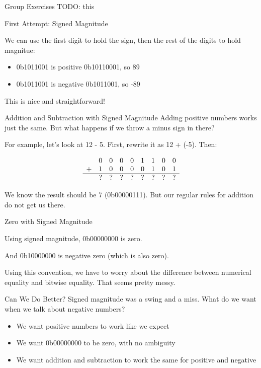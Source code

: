 \begin{frame}{Group Exercises}
TODO: this
\end{frame}



\begin{frame}{First Attempt: Signed Magnitude}

	We can use the first digit to hold the sign, then the rest of the digits to
	hold magnitue:

	\begin{itemize}
		\item 0b1011001 is positive 0b10110001, so 89
		\item 0b1011001 is negative 0b1011001, so -89
	\end{itemize}

	This is nice and straightforward!

\end{frame}

\begin{frame}{Addition and Subtraction with Signed Magnitude}
	Adding positive numbers works just the same. But what happens if we throw a minus sign in there?

	For example, let's look at 12 - 5. First, rewrite it as 12 + (-5). Then:

	\[
		\begin{array}{ccccccccc}
			  & 0 & 0 & 0 & 0 & 1 & 1 & 0 & 0 \\
			+ & 1 & 0 & 0 & 0 & 0 & 1 & 0 & 1 \\
			\hline
			  & ? & ? & ? & ? & ? & ? & ? & ? \\
		\end{array}
	\]

	We know the result should be 7 (0b00000111). But our regular rules for addition
	do not get us there.
\end{frame}

\begin{frame}{Zero with Signed Magnitude}

	Using signed magnitude, 0b00000000 is zero.

	And 0b10000000 is negative zero (which is also zero).

	Using this convention, we have to worry about the difference between numerical
	equality and bitwise equality. That seems pretty messy.
\end{frame}

\begin{frame}{Can We Do Better?}
	Signed magnitude was a swing and a miss. What do we want when we talk about negative numbers?
	\begin{itemize}
		\item We want positive numbers to work like we expect
		\item We want 0b00000000 to be zero, with no ambiguity
		\item We want addition and subtraction to work the same for positive and negative
	\end{itemize}
\end{frame}


